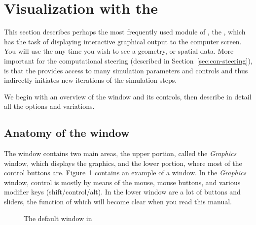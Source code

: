   \newcommand{\ringwidget}%
  {\centerline{\epsfig{file=figures/widget-ring.eps,height=4in,
  bbllx=0, bblly=0, bburx=458, bbury=342}}}
\begin{htmlonly}
  \newcommand{\ringwidget}{%
  \htmladdimg[align=top,width=458,alt="ringwidget"]
  {../figures/widget-box.gif}}
\end{htmlonly}

\newcommand{\graphics}{\emph{Graphics}}

\section{Visualization with the \viewer{}}
\label{sec:viewer}
\index{\viewer{}}

This section describes perhaps the most frequently used module of \SR{},
the \viewer{}, which has the task of displaying interactive graphical output
to the computer screen.  You will use the \viewer{} any time you wish to see
a geometry, or spatial data.  More important for the computational
steering (described in Section~\ref{sec:con-steering}), is that the \viewer{}
provides access to many simulation parameters and controls and thus
indirectly initiates new iterations of the simulation steps.

We begin with an overview of the \viewer{} window and its controls, then
describe in detail all the options and variations.

\subsection{Anatomy of the \viewer{} window}
\label{sec:viewer-anatomy} 

The \viewer{} window contains two main areas, the upper portion, called the
\graphics{} window, which displays the graphics, and the lower portion,
where most of the control buttons are.  Figure~\ref{fig:viewwindow}
contains an example of a \viewer{} window. In the \graphics{}
window, control is mostly by means of the mouse, mouse buttons, and various
modifier keys (shift/control/alt).  In the lower window are a lot of
buttons and sliders, the function of which will become clear when you read
this manual.

\begin{figure}[htb]
  \begin{makeimage}
  \end{makeimage}
  \viewerwindow
  \caption{\label{fig:viewwindow} The default \viewer{} window in \SR{}}
\end{figure}


